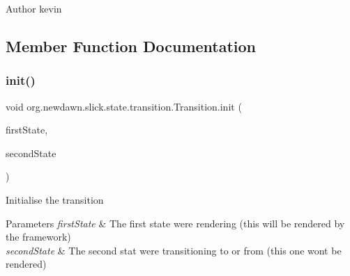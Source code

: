 \begin{DoxyAuthor}{Author}
kevin 
\end{DoxyAuthor}


\subsection{Member Function Documentation}
\mbox{\label{interfaceorg_1_1newdawn_1_1slick_1_1state_1_1transition_1_1_transition_a7b59f0c9205f1f0417ee18bc526e5b01}} 
\subsubsection{\texorpdfstring{init()}{init()}}
{\footnotesize\ttfamily void org.\+newdawn.\+slick.\+state.\+transition.\+Transition.\+init (\begin{DoxyParamCaption}\item[{\mbox{\hyperlink{interfaceorg_1_1newdawn_1_1slick_1_1state_1_1_game_state}{Game\+State}}}]{first\+State,  }\item[{\mbox{\hyperlink{interfaceorg_1_1newdawn_1_1slick_1_1state_1_1_game_state}{Game\+State}}}]{second\+State }\end{DoxyParamCaption})}

Initialise the transition


\begin{DoxyParams}{Parameters}
{\em first\+State} & The first state we\textquotesingle{}re rendering (this will be rendered by the framework) \\
\hline
{\em second\+State} & The second stat we\textquotesingle{}re transitioning to or from (this one won\textquotesingle{}t be rendered) \\
\hline
\end{DoxyParams}


